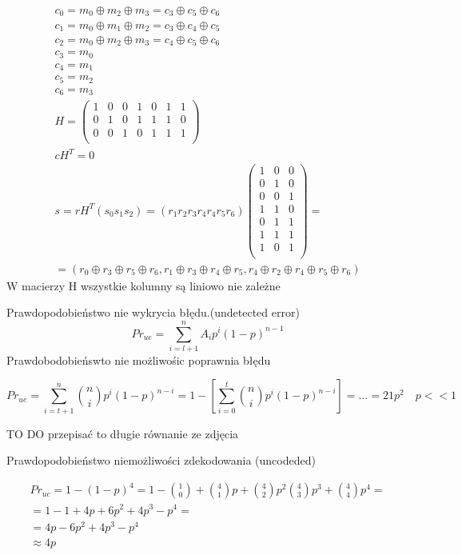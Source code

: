 \documentclass[12pt]{article}
\begin{document}
\begin{align*}
   c_0 = m_0 \oplus m_2 \oplus m_3 = c_3 \oplus c_5 \oplus c_6  \\
   c_1 = m_0 \oplus m_1 \oplus m_2 = c_3 \oplus c_4 \oplus c_5  \\
   c_2 = m_0 \oplus m_2 \oplus m_3 = c_4 \oplus c_5 \oplus c_6  \\
   c_3 = m_0 \\
   c_4 = m_1 \\
   c_5 = m_2 \\
   c_6 = m_3 \\
   H = 
 \begin{pmatrix}
    1 & 0 & 0 & 1 & 0  & 1 & 1 \\
    0 & 1 & 0 & 1 & 1  & 1 & 0 \\
    0 & 0 & 1 & 0 & 1  & 1 & 1\\
\end{pmatrix} \\
cH^T = 0 \\
s = rH^T
    (s_0s_1s_2) = (r_1r_2r_3r_4r_4r_5r_6)
    \begin{pmatrix}
        1 & 0 & 0 \\
        0 & 1 & 0 \\
        0 & 0 & 1 \\
        1 & 1 & 0 \\
        0 & 1 & 1 \\
        1 & 1 & 1 \\
        1 & 0 & 1 \\
    \end{pmatrix} = \\ = (
    r_0\oplus r_3 \oplus r_5 \oplus r_6,
    r_1 \oplus r_3 \oplus r_4\oplus r_5,
    r_4\oplus r_2\oplus r_4\oplus r_5\oplus r_6)
\end{align*}
W macierzy H wszystkie kolumny są liniowo nie zależne


Prawdopodobieństwo nie wykrycia błędu.(undetected error)
$$
Pr_{ue} = \sum^n_{i=l+1} A_ip^i(1-p)^{n-1}
$$
Prawdobodobieńswto nie możliwośic poprawnia błędu 

$$
Pr_{ue} = \sum^n_{i=t+1} \binom{n}{i}p^i(1-p)^{n-i} =
1-\left[ \sum^t_{i=0} \binom{n}{i}p^i(1-p)^{n-i} \right] =\dots  = 21p^2 \quad p<<1
$$

TO DO przepisać to długie równanie ze zdjęcia

Prawdopodobieństwo niemożliwości zdekodowania (uncodeded) 

\begin{align*}
Pr_{uc} = 1 - (1-p)^4 = 1 - \binom{1}{0} + \binom{4}{1}p +
\binom{4}{2}p^2 \binom{4}{3}p^3 + \binom{4}{4}p^4 = \\
= 1-1+4p + 6p^2 + 4p^3 - p^4 = \\
= 4p - 6p^2 + 4p^3 - p^4 \\
\approx 4p
\end{align*} 
\end{document}
